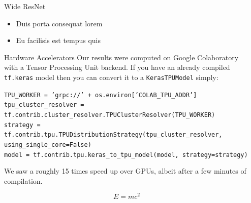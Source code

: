\documentclass[final]{beamer}
\newlength{\sepwid}
\newlength{\onecolwid}
\newlength{\twocolwid}
\begin{document}
\begin{frame}[t]
\begin{columns}[t]
\begin{column}{\sepwid}\end{column} %
\begin{column}{\twocolwid} %
\begin{columns}[t,totalwidth=\twocolwid] %

\begin{column}{\onecolwid}\vspace{-.6in} %
\begin{block}{Wide ResNet}
\cite{Zagoruyko2016}
\begin{itemize}
\item Duis porta consequat lorem
\item Eu facilisis est tempus quis
\end{itemize}
\end{block}


\begin{block}{Hardware Accelerators}
Our results were computed on Google Colaboratory with a Tensor Processing Unit backend.
If you have an already compiled \texttt{tf.keras} model then you can convert it to a \texttt{KerasTPUModel} simply:

{\small
\texttt{TPU\_WORKER = 'grpc://' + os.environ['COLAB\_TPU\_ADDR']} \\
\texttt{tpu\_cluster\_resolver = tf.contrib.cluster\_resolver.TPUClusterResolver(TPU\_WORKER)} \\
\texttt{strategy = tf.contrib.tpu.TPUDistributionStrategy(tpu\_cluster\_resolver, using\_single\_core=False)} \\
\texttt{model = tf.contrib.tpu.keras\_to\_tpu\_model(model, strategy=strategy)}
}

We saw a roughly 15 times speed up over GPUs, albeit after a few minutes of compilation. 

\begin{equation}
E = mc^{2}
\label{eqn:Einstein}
\end{equation}

\end{block}
\end{column} %
\end{columns} %




\end{column}
\end{columns}
\end{frame}
\end{document}
